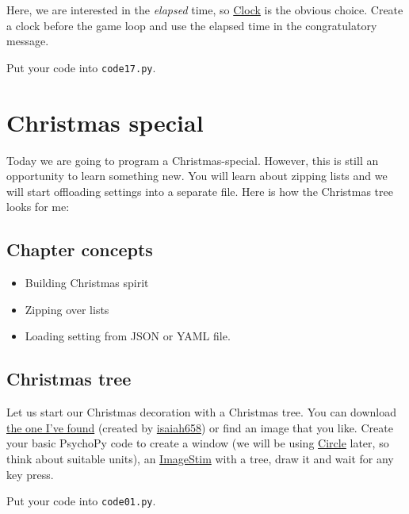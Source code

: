 \documentclass[
]{book}
\providecommand{\tightlist}{%
  \setlength{\itemsep}{0pt}\setlength{\parskip}{0pt}}
\begin{document}
Here, we are interested in the \emph{elapsed} time, so \href{https://psychopy.org/api/clock.html\#psychopy.clock.Clock}{Clock} is the obvious choice. Create a clock before the game loop and use the elapsed time in the congratulatory message.

Put your code into \texttt{code17.py}.

\hypertarget{christmas-special}{%
\chapter{Christmas special}\label{christmas-special}}

Today we are going to program a Christmas-special. However, this is still an opportunity to learn something new. You will learn about zipping lists and we will start offloading settings into a separate file. Here is how the Christmas tree looks for me:

\hypertarget{chapter-concepts-6}{%
\section{Chapter concepts}\label{chapter-concepts-6}}

\begin{itemize}
\tightlist
\item
  Building Christmas spirit
\item
  Zipping over lists
\item
  Loading setting from JSON or YAML file.
\end{itemize}

\hypertarget{christmas-tree}{%
\section{Christmas tree}\label{christmas-tree}}

Let us start our Christmas decoration with a Christmas tree. You can download \href{material/pine-tree.png}{the one I've found} (created by \href{https://openclipart.org/artist/isaiah658}{isaiah658}) or find an image that you like. Create your basic PsychoPy code to create a window (we will be using \href{https://psychopy.org/api/visual/circle.html\#psychopy.visual.circle.Circle}{Circle} later, so think about suitable units), an \href{https://psychopy.org/api/visual/imagestim.html\#psychopy.visual.ImageStim}{ImageStim} with a tree, draw it and wait for any key press.

Put your code into \texttt{code01.py}.
\end{document}

